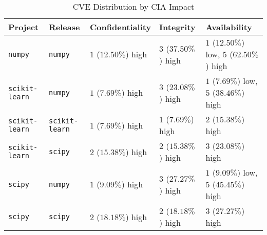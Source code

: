 \begin{table}
\caption{CVE Distribution by CIA Impact}
\label{tab:cve-cia-distribution}
\begin{tabular}{lllll}
\toprule
Project & Release & Confidentiality & Integrity & Availability \\
\midrule
\texttt{numpy} & \texttt{numpy} & $1$ ($12.50\%$) high & $3$ ($37.50\%$) high & $1$ ($12.50\%$) low, $5$ ($62.50\%$) high \\
\texttt{scikit-learn} & \texttt{numpy} & $1$ ($7.69\%$) high & $3$ ($23.08\%$) high & $1$ ($7.69\%$) low, $5$ ($38.46\%$) high \\
\texttt{scikit-learn} & \texttt{scikit-learn} & $1$ ($7.69\%$) high & $1$ ($7.69\%$) high & $2$ ($15.38\%$) high \\
\texttt{scikit-learn} & \texttt{scipy} & $2$ ($15.38\%$) high & $2$ ($15.38\%$) high & $3$ ($23.08\%$) high \\
\texttt{scipy} & \texttt{numpy} & $1$ ($9.09\%$) high & $3$ ($27.27\%$) high & $1$ ($9.09\%$) low, $5$ ($45.45\%$) high \\
\texttt{scipy} & \texttt{scipy} & $2$ ($18.18\%$) high & $2$ ($18.18\%$) high & $3$ ($27.27\%$) high \\
\bottomrule
\end{tabular}
\end{table}
